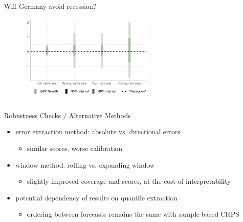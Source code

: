 \documentclass[en]{sdqbeamer}
\begin{document}
\addtocounter{framenumber}{-1}
\begin{frame}{Will Germany avoid recession?}
\begin{figure}
        \centering
        \includegraphics[width=0.6\textwidth]{figures/horizon_uncc_germany2023_current.pdf}
        \label{fig:enter-label}
    \end{figure}


\end{frame}


\begin{frame}{Robustness Checks / Alternative Methods}
\begin{itemize}
    \item error extraction method: absolute vs. directional errors
    \begin{itemize}
    \item similar scores, worse calibration \hyperlink{errorextraction}{}
    \end{itemize}
    \item window method: rolling vs. expanding window
    \begin{itemize}
    \item slightly improved coverage and scores, at the cost of interpretability \hyperlink{extractionmethod}{}
    \end{itemize}
    \item potential dependency of results on quantile extraction \\
    \begin{itemize}
        \item ordering between forecasts remains the same with sample-based CRPS \hyperlink{samplecrps}{}
    \end{itemize}
\end{itemize}
\end{frame}
\end{document}
